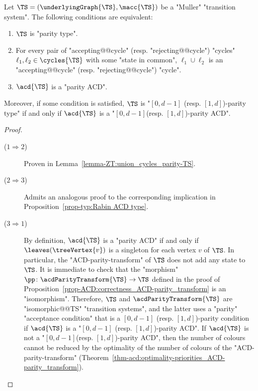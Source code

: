 \documentclass[10pt,a4paper]{amsart}
\begin{document}
\begin{proposition}\label{prop-typ:parity ACD type}
	Let $\TS = (\underlyingGraph{\TS}, \macc{\TS})$ be a "Muller" "transition system". The following conditions are equivalent:
	\begin{enumerate}
		\item $\TS$ is "parity type".
		\item For every pair of "accepting@@cycle" (resp. "rejecting@@cycle") "cycles" $\ell_1, \ell_2\in \cycles{\TS}$  with some "state in common",  $\ell_1\cup \ell_2$ is an "accepting@@cycle" (resp. "rejecting@@cycle") "cycle".
		\item $\acd{\TS}$ is a "parity ACD". 
	\end{enumerate}
	Moreover, if some condition is satisfied, $\TS$ is "$[0,d-1]$ (resp. $[1,d]$)-parity type" if and only if $\acd{\TS}$ is a "$[0,d-1]$(resp. $[1,d]$)-parity ACD".
\end{proposition}
\begin{proof}
	\begin{description}
		\item[($1 \Rightarrow 2$)] Proven in Lemma~\ref{lemma-ZT:union_cycles_parity-TS}.
		
		\item[($2 \Rightarrow 3$)] Admits an analogous proof to the corresponding implication in Proposition~\ref{prop-typ:Rabin ACD type}.
		
		\item[($3 \Rightarrow 1$)] By definition, $\acd{\TS}$ is a "parity ACD" if and only if $\leaves(\treeVertex{v})$ is a singleton for each vertex $v$ of $\TS$. In particular, the "ACD-parity-transform" of $\TS$ does not add any state to $\TS$. It is immediate to check that the "morphism" $\pp\colon \acdParityTransform{\TS} \to \TS$ defined in the proof of Proposition~\ref{prop-ACD:correctness_ACD-parity_transform} is an "isomorphism". Therefore, $\TS$ and $\acdParityTransform{\TS}$ are "isomorphic@@TS" "transition systems", and the latter uses a "parity" "acceptance condition" that is a $[0,d-1]$ (resp. $[1,d]$)-parity condition if $\acd{\TS}$ is a "$[0,d-1]$ (resp. $[1,d]$)-parity ACD". If $\acd{\TS}$ is not a "$[0,d-1]$(resp. $[1,d]$)-parity ACD", then the number of colours cannot be reduced by the optimality of the number of colours of the "ACD-parity-transform" (Theorem~\ref{thm-acd:optimality-priorities_ACD-parity_transform}).\qedhere
	\end{description}
\end{proof}
\end{document}
